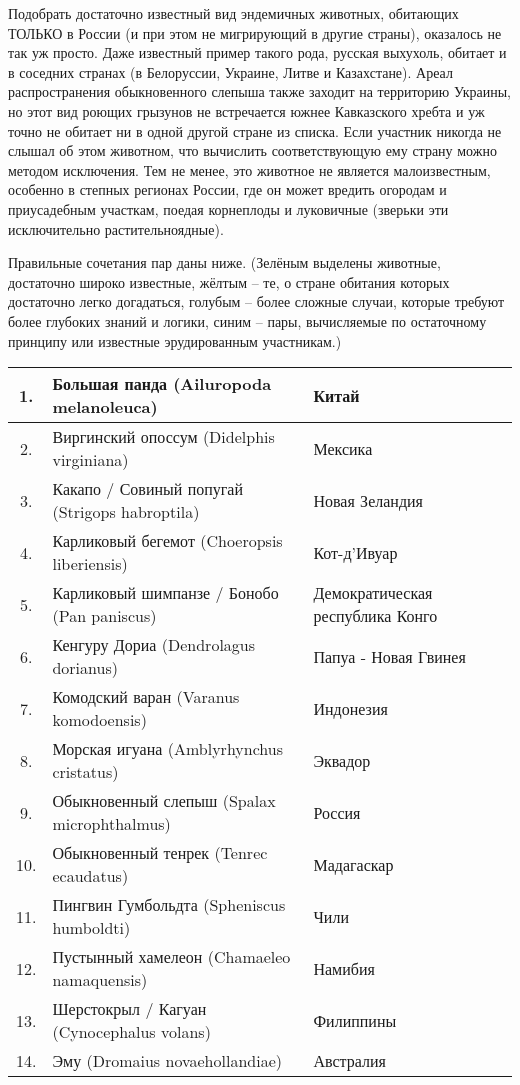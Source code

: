 Подобрать достаточно известный вид эндемичных животных, обитающих ТОЛЬКО в России (и при этом не мигрирующий в другие страны), оказалось не так уж просто. Даже известный пример такого рода, русская выхухоль, обитает и в соседних странах (в Белоруссии, Украине, Литве и Казахстане). Ареал распространения обыкновенного слепыша также заходит на территорию Украины, но этот вид роющих грызунов не встречается южнее Кавказского хребта и уж точно не обитает ни в одной другой стране из списка. Если участник никогда не слышал об этом животном, что вычислить соответствующую ему страну можно методом исключения. Тем не менее, это животное не является малоизвестным, особенно в степных регионах России, где он может вредить огородам и приусадебным участкам, поедая корнеплоды и луковичные (зверьки эти исключительно растительноядные).

Правильные сочетания пар даны ниже. (Зелёным выделены животные, достаточно широко известные, жёлтым – те, о стране обитания которых достаточно легко догадаться, голубым – более сложные случаи, которые требуют более глубоких знаний и логики, синим – пары, вычисляемые по остаточному принципу или известные эрудированным участникам.)

\begin{longtable}{|c|l|p{4cm}|}
    \hline
    \rowcolor{green} 1. & Большая панда (Ailuropoda melanoleuca) & Китай \\
    \hline
    \rowcolor{yellow} 2. & Виргинский опоссум (Didelphis virginiana) & Мексика \\
    \hline
    \rowcolor{green} 3. & Какапо / Совиный попугай (Strigops habroptila) & Новая Зеландия \\
    \hline
    \rowcolor{yellow} 4. & Карликовый бегемот (Choeropsis liberiensis) & Кот-д’Ивуар \\
    \hline
    \rowcolor{green} 5. & Карликовый шимпанзе / Бонобо (Pan paniscus) & Демократическая республика Конго \\
    \hline
    \rowcolor{cyan} 6. & Кенгуру Дориа (Dendrolagus dorianus) & Папуа - Новая Гвинея \\
    \hline
    \rowcolor{green} 7. & Комодский варан (Varanus komodoensis) & Индонезия \\
    \hline
    \rowcolor{green} 8. & Морская игуана (Amblyrhynchus cristatus) & Эквадор \\
    \hline
    \rowcolor{blue} 9. & Обыкновенный слепыш (Spalax microphthalmus) & Россия \\
    \hline
    \rowcolor{cyan} 10. & Обыкновенный тенрек (Tenrec ecaudatus) & Мадагаскар \\
    \hline
    \rowcolor{blue} 11. & Пингвин Гумбольдта (Spheniscus humboldti) & Чили \\
    \hline
    \rowcolor{cyan} 12. & Пустынный хамелеон (Chamaeleo namaquensis) & Намибия \\
    \hline
    \rowcolor{green} 13. & Шерстокрыл / Кагуан (Cynocephalus volans) & Филиппины \\
    \hline
    \rowcolor{green} 14. & Эму (Dromaius novaehollandiae) & Австралия \\
    \hline
\end{longtable}

